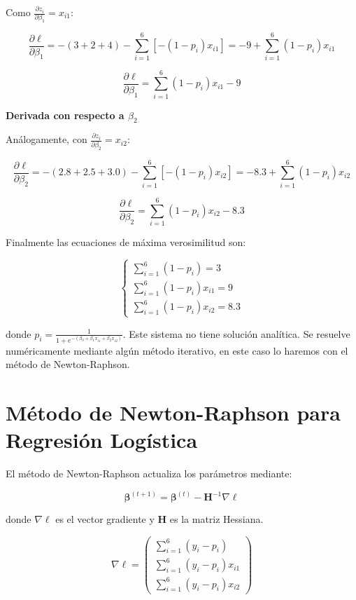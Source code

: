 \documentclass[12pt]{article}
\begin{document}
Como $\frac{\partial z_i}{\partial \beta_1} = x_{i1}$:

\[
\frac{\partial \ell}{\partial \beta_1} = -(3 + 2 + 4) - \sum_{i=1}^{6} \left[ -(1-p_i) x_{i1} \right] = -9 + \sum_{i=1}^{6} (1-p_i) x_{i1}
\]

\[
\frac{\partial \ell}{\partial \beta_1} = \sum_{i=1}^{6} (1-p_i) x_{i1} - 9
\]

\textbf{Derivada con respecto a $\beta_2$}

Análogamente, con $\frac{\partial z_i}{\partial \beta_2} = x_{i2}$:

\[
\frac{\partial \ell}{\partial \beta_2} = -(2.8 + 2.5 + 3.0) - \sum_{i=1}^{6} \left[ -(1-p_i) x_{i2} \right] = -8.3 + \sum_{i=1}^{6} (1-p_i) x_{i2}
\]

\[
\frac{\partial \ell}{\partial \beta_2} = \sum_{i=1}^{6} (1-p_i) x_{i2} - 8.3
\]

Finalmente   las ecuaciones de máxima verosimilitud son:

\[
\begin{cases}
\displaystyle\sum_{i=1}^{6} (1-p_i) = 3 \\[1.5em]
\displaystyle\sum_{i=1}^{6} (1-p_i) x_{i1} = 9 \\[1.5em]
\displaystyle\sum_{i=1}^{6} (1-p_i) x_{i2} = 8.3
\end{cases}
\]

donde $p_i = \frac{1}{1+e^{-(\beta_0 + \beta_1 x_{i1} + \beta_2 x_{i2})}}$. Este sistema no tiene solución analítica. Se resuelve numéricamente mediante algún método iterativo, en este caso lo haremos con el método  de Newton-Raphson.

\section{Método de Newton-Raphson para Regresión Logística}

El método de Newton-Raphson actualiza los parámetros mediante:

\[
\boldsymbol{\beta}^{(t+1)} = \boldsymbol{\beta}^{(t)} - \mathbf{H}^{-1} \nabla \ell
\]

donde $\nabla \ell$ es el vector gradiente y $\mathbf{H}$ es la matriz Hessiana.


\[
\nabla \ell = 
\begin{pmatrix}
\displaystyle\sum_{i=1}^{6} (y_i - p_i) \\[1.5em]
\displaystyle\sum_{i=1}^{6} (y_i - p_i) x_{i1} \\[1.5em]
\displaystyle\sum_{i=1}^{6} (y_i - p_i) x_{i2}
\end{pmatrix}
\]
\end{document}
